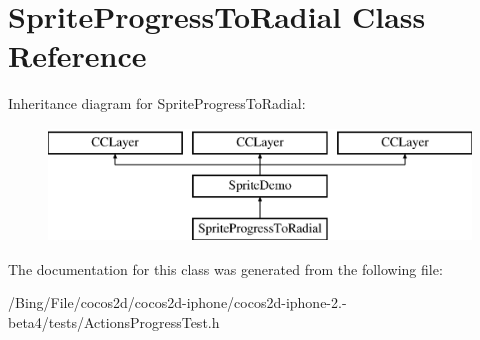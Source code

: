 \hypertarget{interface_sprite_progress_to_radial}{\section{Sprite\-Progress\-To\-Radial Class Reference}
\label{interface_sprite_progress_to_radial}
}
Inheritance diagram for Sprite\-Progress\-To\-Radial\-:\begin{figure}[H]
\begin{center}
\leavevmode
\includegraphics[height=3.000000cm]{interface_sprite_progress_to_radial}
\end{center}
\end{figure}


The documentation for this class was generated from the following file\-:\begin{DoxyCompactItemize}
\item 
/\-Bing/\-File/cocos2d/cocos2d-\/iphone/cocos2d-\/iphone-\/2.-\/beta4/tests/Actions\-Progress\-Test.\-h\end{DoxyCompactItemize}

